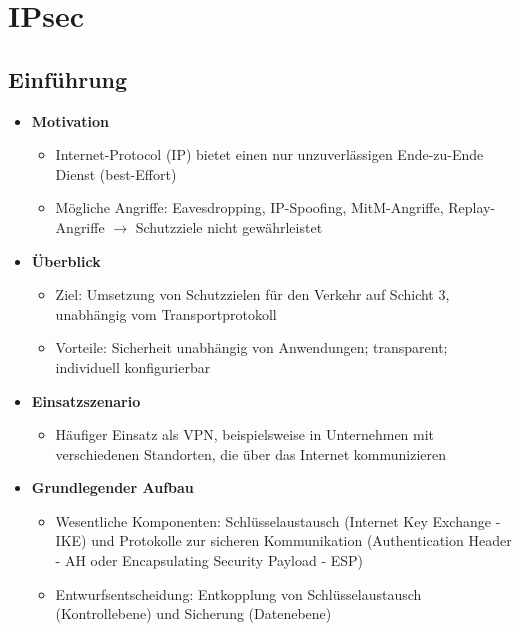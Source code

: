 \section{IPsec}

\subsection{Einführung}
\begin{itemize}
	\item \textbf{Motivation}
	\begin{itemize}
		\item Internet-Protocol (IP) bietet einen nur unzuverlässigen Ende-zu-Ende Dienst (best-Effort)
		\item Mögliche Angriffe: Eavesdropping, IP-Spoofing, MitM-Angriffe, Replay-Angriffe \(\rightarrow\) Schutzziele nicht gewährleistet
	\end{itemize}
	\item \textbf{Überblick}
	\begin{itemize}
		\item Ziel: Umsetzung von Schutzzielen für den Verkehr auf Schicht 3, unabhängig vom Transportprotokoll
		\item Vorteile: Sicherheit unabhängig von Anwendungen; transparent; individuell konfigurierbar
	\end{itemize}
	\item \textbf{Einsatzszenario}
	\begin{itemize}
		\item Häufiger Einsatz als VPN, beispielsweise in Unternehmen mit verschiedenen Standorten, die über das Internet kommunizieren
	\end{itemize}
	\item \textbf{Grundlegender Aufbau}
	\begin{itemize}
		\item Wesentliche Komponenten: Schlüsselaustausch (Internet Key Exchange - IKE) und Protokolle zur sicheren Kommunikation (Authentication Header - AH oder Encapsulating Security Payload - ESP)
		\item Entwurfsentscheidung: Entkopplung von Schlüsselaustausch (Kontrollebene) und Sicherung (Datenebene)
	\end{itemize}
\end{itemize}


